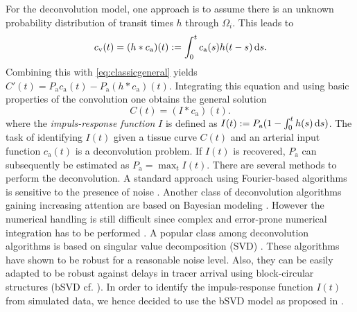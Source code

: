 \documentclass[journal,twocolumn]{IEEEtran}
\newcommand{\ca}{c_\mathrm{a}}
\newcommand{\cout}{c_{\mathrm{v}}}
\newcommand{\Pa}{P_{\mathrm{a}}}
\begin{document}
	For the deconvolution model, one approach is to assume there is an unknown probability distribution of transit times $h$ through $\Omega_i$. 
	This leads to
	\begin{equation}
		\cout(t) = (h*\ca)(t) := \int_0^t \ca(s) h(t-s) \diffint s.
	\end{equation}
	Combining this with \eqref{eq:classicgeneral} yields $C'(t) = \Pa\ca(t)-\Pa (h*\ca)(t)$.
	Integrating this equation and using basic properties of the convolution one obtains the general solution
	\begin{equation}
		C(t) = (I*\ca)(t).
		\label{eq:conv}
	\end{equation}
	where the \emph{impuls-response function} $I$ is defined as $I(t) := \Pa(1-\int_0^t h(s) \diffint s)$.
	The task of identifying $I(t)$ given a tissue curve $C(t)$ and an arterial input function $\ca(t)$ is a deconvolution problem.
	If $I(t)$ is recovered, $\Pa$ can subsequently be estimated as $\Pa = \max_{t} I(t)$.
	There are several methods to perform the deconvolution.
	A standard approach using Fourier-based algorithms is sensitive to the presence of noise \cite{ostergaard96}.
	Another class of deconvolution algorithms gaining increasing attention are based on Bayesian modeling \cite{boutelier12}.
	However the numerical handling is still difficult since complex and error-prone numerical integration has to be performed \cite{boutelier12}.
	A popular class among deconvolution algorithms is based on singular value decomposition (SVD) \cite{ostergaard96}.
	These algorithms have shown to be robust for a reasonable noise level.
	Also, they can be easily adapted to be robust against delays in tracer arrival using block-circular structures (bSVD cf. \cite{wu03}).
	In order to identify the impuls-response function $I(t)$ from simulated data, we hence decided to use the bSVD model as proposed in \cite{wu03}.

\end{document}
